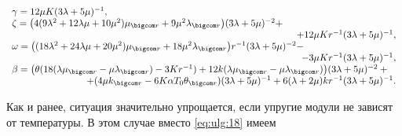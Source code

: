 \begin{equation} 

\label{eq:ulg:18} 

\begin{array}{l} 

\gamma =12\mu K (3\lambda +5\mu )^{-1} , 

\\ 

\zeta =\bigl(4 (9\lambda ^{2} +12\lambda \mu +10\mu ^{2} )\mu _{ \bigcom r} +

9\mu ^{2} \lambda _{\bigcom r} \bigr)

(3\lambda +5\mu )^{-2} + \\ 

\hfill +12\mu Kr ^{-1} (3\lambda +5\mu )^{-1} , 

\\ 

\omega =\bigl((18\lambda ^{2} +24\lambda \mu +20\mu ^{2} )\mu _{\bigcom r} +18\mu ^{2} \lambda _{\bigcom r} \bigr)

r^{-1} (3\lambda +5\mu )^{-2} - 

\\ 

\hfill

-3\mu Kr^{-1} (3\lambda +5\mu )^{-1} ,

\\ 

\beta =\bigl(\theta (18(\lambda \mu _{\bigcom r} -\mu \lambda _{\bigcom r} )-3Kr^{-1} )+

12k(\lambda \mu _{\bigcom r} -\mu \lambda _{\bigcom r} )\bigr)

(3\lambda +5\mu )^{-2} + \phantom{~~}

\\ 

\hfill

+(4\mu k_{\bigcom r} -6K\alpha T_{0}\theta_{\bigcom r} )

(3\lambda +5\mu )^{-1} +6(\lambda +2\mu )kr ^{-1} (3\lambda +5\mu )^{-1} .

\end{array} 

\end{equation} 



Как и ранее, ситуация значительно упрощается, если упругие модули не зависят от температуры. В этом случае вместо  \eqref{eq:ulg:18} имеем

